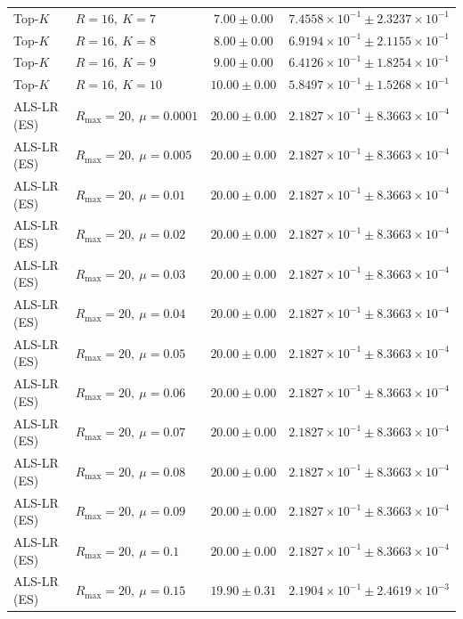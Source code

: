 \begin{table}[t]
\begin{tabular}{@{}llcc@{}}
Top-\(K\) & \(R=16,\ K=7\) & \(7.00 \pm 0.00\) & \(7.4558{\times}10^{-1} \pm 2.3237{\times}10^{-1}\) \\
Top-\(K\) & \(R=16,\ K=8\) & \(8.00 \pm 0.00\) & \(6.9194{\times}10^{-1} \pm 2.1155{\times}10^{-1}\) \\
Top-\(K\) & \(R=16,\ K=9\) & \(9.00 \pm 0.00\) & \(6.4126{\times}10^{-1} \pm 1.8254{\times}10^{-1}\) \\
Top-\(K\) & \(R=16,\ K=10\) & \(10.00 \pm 0.00\) & \(5.8497{\times}10^{-1} \pm 1.5268{\times}10^{-1}\) \\
ALS-LR (ES) & \(R_{\max}=20,\ \mu=0.0001\) & \(20.00 \pm 0.00\) & \(2.1827{\times}10^{-1} \pm 8.3663{\times}10^{-4}\) \\
ALS-LR (ES) & \(R_{\max}=20,\ \mu=0.005\) & \(20.00 \pm 0.00\) & \(2.1827{\times}10^{-1} \pm 8.3663{\times}10^{-4}\) \\
ALS-LR (ES) & \(R_{\max}=20,\ \mu=0.01\) & \(20.00 \pm 0.00\) & \(2.1827{\times}10^{-1} \pm 8.3663{\times}10^{-4}\) \\
ALS-LR (ES) & \(R_{\max}=20,\ \mu=0.02\) & \(20.00 \pm 0.00\) & \(2.1827{\times}10^{-1} \pm 8.3663{\times}10^{-4}\) \\
ALS-LR (ES) & \(R_{\max}=20,\ \mu=0.03\) & \(20.00 \pm 0.00\) & \(2.1827{\times}10^{-1} \pm 8.3663{\times}10^{-4}\) \\
ALS-LR (ES) & \(R_{\max}=20,\ \mu=0.04\) & \(20.00 \pm 0.00\) & \(2.1827{\times}10^{-1} \pm 8.3663{\times}10^{-4}\) \\
ALS-LR (ES) & \(R_{\max}=20,\ \mu=0.05\) & \(20.00 \pm 0.00\) & \(2.1827{\times}10^{-1} \pm 8.3663{\times}10^{-4}\) \\
ALS-LR (ES) & \(R_{\max}=20,\ \mu=0.06\) & \(20.00 \pm 0.00\) & \(2.1827{\times}10^{-1} \pm 8.3663{\times}10^{-4}\) \\
ALS-LR (ES) & \(R_{\max}=20,\ \mu=0.07\) & \(20.00 \pm 0.00\) & \(2.1827{\times}10^{-1} \pm 8.3663{\times}10^{-4}\) \\
ALS-LR (ES) & \(R_{\max}=20,\ \mu=0.08\) & \(20.00 \pm 0.00\) & \(2.1827{\times}10^{-1} \pm 8.3663{\times}10^{-4}\) \\
ALS-LR (ES) & \(R_{\max}=20,\ \mu=0.09\) & \(20.00 \pm 0.00\) & \(2.1827{\times}10^{-1} \pm 8.3663{\times}10^{-4}\) \\
ALS-LR (ES) & \(R_{\max}=20,\ \mu=0.1\) & \(20.00 \pm 0.00\) & \(2.1827{\times}10^{-1} \pm 8.3663{\times}10^{-4}\) \\
ALS-LR (ES) & \(R_{\max}=20,\ \mu=0.15\) & \(19.90 \pm 0.31\) & \(2.1904{\times}10^{-1} \pm 2.4619{\times}10^{-3}\) \\

\end{tabular}
\end{table}

